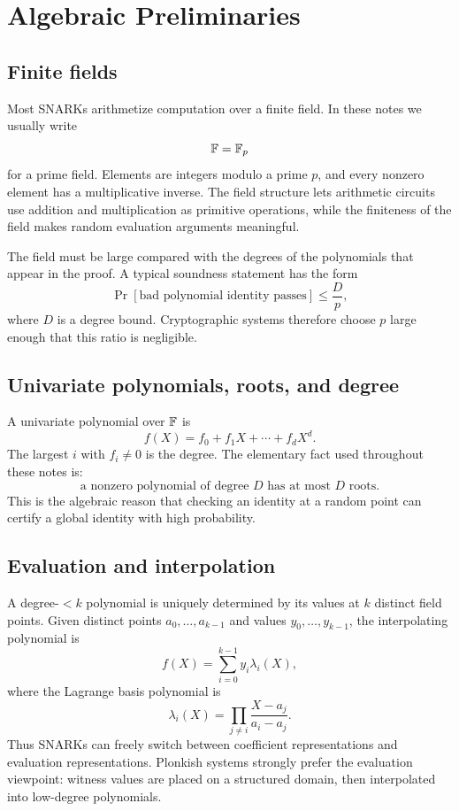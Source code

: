 ﻿\section{Algebraic Preliminaries}
\label{sec:algebra-preliminaries}

\subsection{Finite fields}

Most SNARKs arithmetize computation over a finite field. In these notes we usually write
\[
    \mathbb{F}=\mathbb{F}_p
\]
for a prime field. Elements are integers modulo a prime $p$, and every nonzero element has a multiplicative inverse. The field structure lets arithmetic circuits use addition and multiplication as primitive operations, while the finiteness of the field makes random evaluation arguments meaningful.

The field must be large compared with the degrees of the polynomials that appear in the proof. A typical soundness statement has the form
\[
    \Pr[\text{bad polynomial identity passes}]\le \frac{D}{p},
\]
where $D$ is a degree bound. Cryptographic systems therefore choose $p$ large enough that this ratio is negligible.

\subsection{Univariate polynomials, roots, and degree}

A univariate polynomial over $\mathbb{F}$ is
\[
    f(X)=f_0+f_1X+\cdots+f_dX^d.
\]
The largest $i$ with $f_i\neq 0$ is the degree. The elementary fact used throughout these notes is:
\[
    \text{a nonzero polynomial of degree }D\text{ has at most }D\text{ roots.}
\]
This is the algebraic reason that checking an identity at a random point can certify a global identity with high probability.

\subsection{Evaluation and interpolation}

A degree-$<k$ polynomial is uniquely determined by its values at $k$ distinct field points. Given distinct points $a_0,\ldots,a_{k-1}$ and values $y_0,\ldots,y_{k-1}$, the interpolating polynomial is
\[
    f(X)=\sum_{i=0}^{k-1} y_i\lambda_i(X),
\]
where the Lagrange basis polynomial is
\[
    \lambda_i(X)=\prod_{j\neq i}\frac{X-a_j}{a_i-a_j}.
\]
Thus SNARKs can freely switch between coefficient representations and evaluation representations. Plonkish systems strongly prefer the evaluation viewpoint: witness values are placed on a structured domain, then interpolated into low-degree polynomials.

